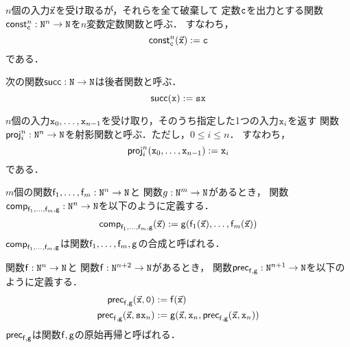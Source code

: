 \newcommand{\cconst}[2]{\cfun{const}^{#1}_{\syn{#2}}}
\begin{myDefinition}[定数関数]
  $n$個の入力$\vec{\mathtt{x}}$を受け取るが，それらを全て破棄して
  定数$\mathtt{c}$を出力とする関数$\cconst{n}{c}:\synNat^n \to \synNat$を$n$変数定数関数と呼ぶ．
  すなわち，
  \begin{equation*}
    \cconst{n}{c}(\vec{\syn{x}}) \defeq \syn{c}
  \end{equation*}
  である．
\end{myDefinition}

\newcommand{\csucc}{\cfun{succ}}
\begin{myDefinition}[後者関数]
  次の関数$\csucc:\synNat \to \synNat$は後者関数と呼ぶ．
  \begin{equation*}
    \csucc(\syn{x}) \defeq \synS \syn{x}
  \end{equation*}
\end{myDefinition}


\newcommand{\cproj}[2]{\cfun{proj}^{#1}_{#2}}
\begin{myDefinition}[射影関数]
  $n$個の入力$\mathtt{x}_0,\dots,\mathtt{x}_{n-1}$を受け取り，そのうち指定した1つの入力$\mathtt{x}_i$を返す
  関数$\cproj{n}{i}:\synNat^n \to \synNat$を射影関数と呼ぶ．ただし，$0 \leq i \leq n$．
  すなわち，
  \begin{equation*}
    \cproj{n}{i}(\syn{x}_0,\dots,\syn{x}_{n-1}) \defeq \syn{x}_i
  \end{equation*}
  である．
\end{myDefinition}

\newcommand{\ccomp}[1]{\cfun{comp}_{#1}}
\begin{myDefinition}[関数合成]
  $m$個の関数$\mathsf{f}_1,\dots,\mathsf{f}_m:\mathtt{N}^n \to \mathtt{N}$と
  関数$g:\mathtt{N}^m \to \mathtt{N}$があるとき，
  関数$\ccomp{\cfun{f}_1,\dots,\cfun{f}_m,\cfun{g}}:\synNat^n \to \synNat$を以下のように定義する．
  \begin{align*}
    \ccomp{\cfun{f}_1,\dots,\cfun{f}_m,\cfun{g}}(\vec{\syn{x}}) \defeq \cfun{g}( \cfun{f}_1(\vec{\syn{x}}), \dots, \cfun{f}_m(\vec{\syn{x}}))
  \end{align*}
  $\ccomp{\cfun{f}_1,\dots,\cfun{f}_m,\cfun{g}}$は関数$\mathsf{f}_1,\dots,\mathsf{f}_m,\mathsf{g}$の合成と呼ばれる．
\end{myDefinition}

\newcommand{\cprec}[1]{\cfun{prec}_{#1}}
\begin{myDefinition}[原始再帰]
  関数$\mathsf{f}:\mathtt{N}^n \to \mathtt{N}$と
  関数$\mathsf{f}:\mathtt{N}^{n+2} \to \mathtt{N}$があるとき，
  関数$\cprec{\cfun{f},\cfun{g}}:\synNat^{n+1} \to \synNat$を以下のように定義する．
  \begin{align*}
    \cprec{\cfun{f},\cfun{g}}(\vec{\syn{x}},\syn{0})           & \defeq \cfun{f}(\vec{\syn{x}})                                                                  \\
    \cprec{\cfun{f},\cfun{g}}(\vec{\syn{x}},\synS \syn{x}_{n}) & \defeq \cfun{g}(\vec{\syn{x}},\syn{x}_{n},\cprec{\cfun{f},\cfun{g}}(\vec{\syn{x}},\syn{x}_{n}))
  \end{align*}
  $\cprec{\cfun{f},\cfun{g}}$は関数$\mathsf{f},\mathsf{g}$の原始再帰と呼ばれる．
\end{myDefinition}

